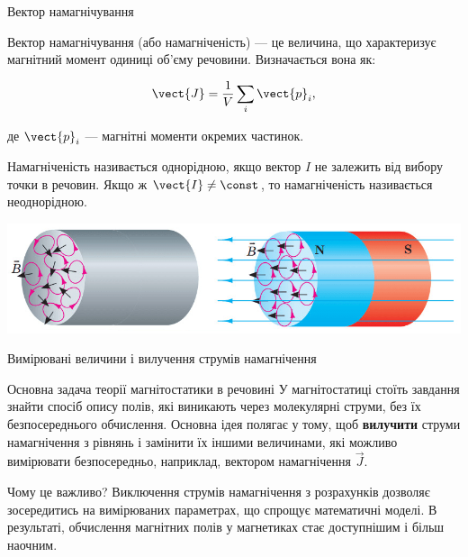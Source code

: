 \documentclass{beamer}
\begin{document}
\begin{frame}{Вектор намагнічування}{}
	\begin{block}{}
		\alert{Вектор намагнічування} (або \alert{намагніченість}) — це величина, що характеризує магнітний момент одиниці об'єму речовини. Визначається вона
		як:

		\begin{equation*}
			\vect{J} = \frac{1}{V}\sum_i\vect{p}_i,
		\end{equation*}

		де $\vect{p}_i$ --- магнітні моменти окремих частинок.
	\end{block}


	\begin{block}{}\justifying\small
		Намагніченість називається \alert{однорідною}, якщо вектор $I$ не залежить від вибору точки в речовин. Якщо ж $\vect{I}\neq\const$, то намагніченість
		називається \alert{неоднорідною}.
	\end{block}
	\begin{center}
		\includegraphics[width=1\linewidth]{AmpereHypotesis}
	\end{center}
\end{frame}


\begin{frame}{Вимірювані величини і вилучення струмів намагнічення}{}
	\begin{alertblock}{Основна задача теорії магнітостатики в речовині}\justifying
		У магнітостатиці стоїть завдання знайти спосіб опису полів, які виникають через молекулярні струми, без їх безпосереднього обчислення.
		Основна ідея полягає у тому, щоб \textbf{вилучити} струми намагнічення з рівнянь і замінити їх іншими величинами, які можливо вимірювати
		безпосередньо, наприклад, вектором намагнічення $\vec{J}$.
	\end{alertblock}
	\begin{block}{Чому це важливо?}\justifying
		Виключення струмів намагнічення з розрахунків дозволяє зосередитись на вимірюваних параметрах, що спрощує математичні моделі. В результаті,
		обчислення магнітних полів у магнетиках стає доступнішим і більш наочним.
	\end{block}
\end{frame}
\end{document}
